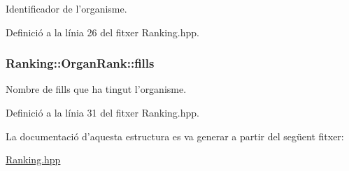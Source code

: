 Identificador de l'organisme. 



Definició a la línia 26 del fitxer Ranking.\-hpp.

\hypertarget{struct_ranking_1_1_organ_rank_a127f9a8768fd7cfda05c3cb2f9f8cfee}{
\subsubsection[{fills}]{\setlength{\rightskip}{0pt plus 5cm}Ranking\-::\-Organ\-Rank\-::fills}}\label{struct_ranking_1_1_organ_rank_a127f9a8768fd7cfda05c3cb2f9f8cfee}


Nombre de fills que ha tingut l'organisme. 



Definició a la línia 31 del fitxer Ranking.\-hpp.



La documentació d'aquesta estructura es va generar a partir del següent fitxer\-:\begin{DoxyCompactItemize}
\item 
\hyperlink{_ranking_8hpp}{Ranking.\-hpp}\end{DoxyCompactItemize}
